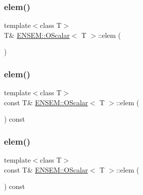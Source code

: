 \mbox{\label{classENSEM_1_1OScalar_af07cc94eb09bfc29991d8fdc30727574}} 
\subsubsection{\texorpdfstring{elem()}{elem()}\hspace{0.1cm}{\footnotesize\ttfamily [3/6]}}
{\footnotesize\ttfamily template$<$class T$>$ \\
T\& \mbox{\hyperlink{classENSEM_1_1OScalar}{E\+N\+S\+E\+M\+::\+O\+Scalar}}$<$ T $>$\+::elem (\begin{DoxyParamCaption}{ }\end{DoxyParamCaption})\hspace{0.3cm}{\ttfamily [inline]}}

\mbox{\label{classENSEM_1_1OScalar_af797ae7d3763acab7b024aa159b3a7b8}} 
\subsubsection{\texorpdfstring{elem()}{elem()}\hspace{0.1cm}{\footnotesize\ttfamily [4/6]}}
{\footnotesize\ttfamily template$<$class T$>$ \\
const T\& \mbox{\hyperlink{classENSEM_1_1OScalar}{E\+N\+S\+E\+M\+::\+O\+Scalar}}$<$ T $>$\+::elem (\begin{DoxyParamCaption}{ }\end{DoxyParamCaption}) const\hspace{0.3cm}{\ttfamily [inline]}}

\mbox{\label{classENSEM_1_1OScalar_af797ae7d3763acab7b024aa159b3a7b8}} 
\subsubsection{\texorpdfstring{elem()}{elem()}\hspace{0.1cm}{\footnotesize\ttfamily [5/6]}}
{\footnotesize\ttfamily template$<$class T$>$ \\
const T\& \mbox{\hyperlink{classENSEM_1_1OScalar}{E\+N\+S\+E\+M\+::\+O\+Scalar}}$<$ T $>$\+::elem (\begin{DoxyParamCaption}{ }\end{DoxyParamCaption}) const\hspace{0.3cm}{\ttfamily [inline]}}

